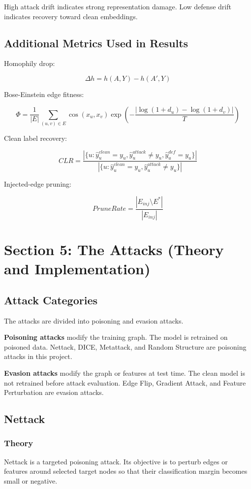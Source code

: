 \documentclass[12pt,a4paper]{article}
\begin{document}
High attack drift indicates strong representation damage. Low defense drift indicates recovery toward clean embeddings.

\subsection{Additional Metrics Used in Results}
Homophily drop:

$$
\Delta h=h(A,Y)-h(A',Y)
$$

Bose-Einstein edge fitness:

$$
\Phi=\frac{1}{|E|}\sum_{(u,v)\in E}\cos(x_u,x_v)\exp\left(-\frac{|\log(1+d_u)-\log(1+d_v)|}{T}\right)
$$

Clean label recovery:

$$
CLR=\frac{|\{u:\hat{y}^{clean}_u=y_u,\hat{y}^{attack}_u\neq y_u,\hat{y}^{def}_u=y_u\}|}
{|\{u:\hat{y}^{clean}_u=y_u,\hat{y}^{attack}_u\neq y_u\}|}
$$

Injected-edge pruning:

$$
PruneRate=\frac{|E_{inj}\setminus E^*|}{|E_{inj}|}
$$

\section{Section 5: The Attacks (Theory and Implementation)}

\subsection{Attack Categories}
The attacks are divided into poisoning and evasion attacks.

\textbf{Poisoning attacks} modify the training graph. The model is retrained on poisoned data. Nettack, DICE, Metattack, and Random Structure are poisoning attacks in this project.

\textbf{Evasion attacks} modify the graph or features at test time. The clean model is not retrained before attack evaluation. Edge Flip, Gradient Attack, and Feature Perturbation are evasion attacks.

\subsection{Nettack}
\subsubsection{Theory}
Nettack is a targeted poisoning attack. Its objective is to perturb edges or features around selected target nodes so that their classification margin becomes small or negative.
\end{document}
